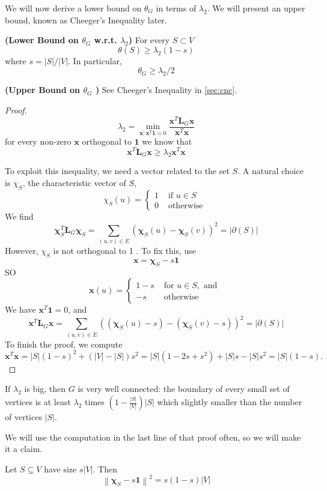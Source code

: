 \documentclass{article}
\newcommand{\bfs}[1]{\textbf{({#1}) }}
\begin{document}
We will now derive a lower bound on $\theta_{G}$ in terms of $\lambda_{2}$. We will present an upper bound, known as Cheeger's Inequality later.
\begin{thma}{\bfs{Lower Bound on $\theta_{G}$ w.r.t. $\lambda_{2}$}}\label{lp:thmlower}
For every $S \subset V$
$$
\theta(S) \geq \lambda_{2}(1-s)
$$
where $s=|S| /|V| .$ In particular,
$$
\theta_{G} \geq \lambda_{2} / 2
$$
\end{thma} 
\begin{rema}{\bfs{Upper Bound on $\theta_{G}$ }}\label{lp:thmlower}
See Cheeger’s Inequality in \cref{sec:cnc}.
\end{rema}
\begin{proof}
$$
\lambda_{2}=\min _{\boldsymbol{x}: \boldsymbol{x}^{T} \mathbf{1}=0} \frac{\boldsymbol{x}^{T} \boldsymbol{L}_{G} \boldsymbol{x}}{\boldsymbol{x}^{T} \boldsymbol{x}}
$$
for every non-zero $\boldsymbol{x}$ orthogonal to $\mathbf{1}$ we know that
$$
\boldsymbol{x}^{T} \boldsymbol{L}_{G} \boldsymbol{x} \geq \lambda_{2} \boldsymbol{x}^{T} \boldsymbol{x}
$$

To exploit this inequality, we need a vector related to the set $S .$ A natural choice is $\chi_{S}$, the characteristic vector of $S$,
$$
\chi_{S}(u)=\left\{\begin{array}{ll}
1 & \text { if } u \in S \\
0 & \text { otherwise }
\end{array}\right.
$$
We find
$$
\boldsymbol{\chi}_{S}^{T} \boldsymbol{L}_{G} \boldsymbol{\chi}_{S}=\sum_{(u, v) \in E}\left(\boldsymbol{\chi}_{S}(u)-\boldsymbol{\chi}_{S}(v)\right)^{2}=|\partial(S)|
$$
However, $\chi_{S}$ is not orthogonal to 1 . To fix this, use
$$
\boldsymbol{x}=\boldsymbol{\chi}_{S}-s \mathbf{1}
$$
SO
$$
\boldsymbol{x}(u)=\left\{\begin{array}{ll}
1-s & \text { for } u \in S, \text { and } \\
-s & \text { otherwise }
\end{array}\right.
$$
We have $\boldsymbol{x}^{T} \mathbf{1}=0$, and
$$
\boldsymbol{x}^{T} \boldsymbol{L}_{G} \boldsymbol{x}=\sum_{(u, v) \in E}\left(\left(\boldsymbol{\chi}_{S}(u)-s\right)-\left(\boldsymbol{\chi}_{S}(v)-s\right)\right)^{2}=|\partial(S)|
$$
To finish the proof, we compute
$$
\boldsymbol{x}^{T} \boldsymbol{x}=|S|(1-s)^{2}+(|V|-|S|) s^{2}=|S|\left(1-2 s+s^{2}\right)+|S| s-|S| s^{2}=|S|(1-s) .
$$
\end{proof}

\begin{rema}
If $\lambda_{2}$ is big, then $G$ is very well connected: the boundary of every small set of vertices is at least $\lambda_{2}$ times $(1-\frac{|S|}{|V|})|S|$ which slightly smaller than the number of vertices $|S|$.
\end{rema}
We will use the computation in the last line of that proof often, so we will make it a claim.
\begin{cora}
Let $S \subseteq V$ have size $s|V| .$ Then
$$
\left\|\boldsymbol{\chi}_{S}-s \mathbf{1}\right\|^{2}=s(1-s)|V|
$$
\end{cora} 
\end{document}
